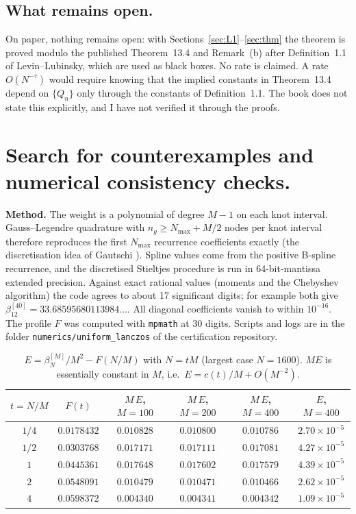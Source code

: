 \documentclass[11pt,a4paper]{article}
\theoremstyle{remark}
\numberwithin{equation}{section}
\begin{document}
\subsection{What remains open.}\label{sec:open}

On paper, nothing remains open: with Sections~\ref{sec:L1}--\ref{sec:thm} the theorem is
proved modulo the published Theorem~13.4 and Remark~(b) after Definition~1.1 of
Levin--Lubinsky, which are used as black boxes. No rate is claimed. A rate
$O(N^{-\tau})$ would require knowing that the implied constants in Theorem~13.4 depend on
$\{Q_n\}$ only through the constants of Definition~1.1. The book does not state this
explicitly, and I have not verified it through the proofs.

\section{Search for counterexamples and numerical consistency checks.}\label{sec:num}

\textbf{Method.} The weight is a polynomial of degree $M-1$ on each knot interval. Gauss--Legendre
quadrature with $n_g\ge N_{\max}+M/2$ nodes per knot interval therefore reproduces the
first $N_{\max}$ recurrence coefficients exactly (the discretisation idea of Gautschi
\cite{gautschi2017}). Spline values come from the positive B-spline recurrence, and the
discretised Stieltjes procedure is run in 64-bit-mantissa extended precision. Against exact
rational values (moments and the Chebyshev algorithm) the code agrees to about 17
significant digits; for example both give $\beta_{12}^{[40]}=33.68595680113984\ldots$. All
diagonal coefficients vanish to within $10^{-16}$. The profile $F$ was computed with
\texttt{mpmath} at 30 digits. Scripts and logs are in the folder
\texttt{numerics/uniform\_lanczos} of the certification repository.

\begin{table}[h]
\centering
\begin{tabular}{@{}cccccc@{}}
\toprule
$t=N/M$ & $F(t)$ & $M\,E$, $M=100$ & $M\,E$, $M=200$ & $M\,E$, $M=400$ & $E$, $M=400$\\
\midrule
$1/4$ & $0.0178432$ & $0.010828$ & $0.010800$ & $0.010786$ & $2.70\times10^{-5}$\\
$1/2$ & $0.0303768$ & $0.017171$ & $0.017111$ & $0.017081$ & $4.27\times10^{-5}$\\
$1$   & $0.0445361$ & $0.017648$ & $0.017602$ & $0.017579$ & $4.39\times10^{-5}$\\
$2$   & $0.0548091$ & $0.010479$ & $0.010471$ & $0.010466$ & $2.62\times10^{-5}$\\
$4$   & $0.0598372$ & $0.004340$ & $0.004341$ & $0.004342$ & $1.09\times10^{-5}$\\
\bottomrule
\end{tabular}
\caption{$E=\beta_N^{[M]}/M^2-F(N/M)$ with $N=tM$ (largest case $N=1600$). $ME$ is
essentially constant in $M$, i.e.\ $E=c(t)/M+O(M^{-2})$.}\label{tab:beta}
\end{table}
\end{document}
